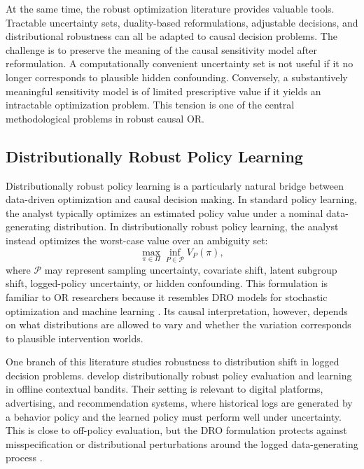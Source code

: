 \documentclass[11pt]{article}
\begin{document}
At the same time, the robust optimization literature provides valuable tools. Tractable uncertainty sets, duality-based reformulations, adjustable decisions, and distributional robustness can all be adapted to causal decision problems. The challenge is to preserve the meaning of the causal sensitivity model after reformulation. A computationally convenient uncertainty set is not useful if it no longer corresponds to plausible hidden confounding. Conversely, a substantively meaningful sensitivity model is of limited prescriptive value if it yields an intractable optimization problem. This tension is one of the central methodological problems in robust causal OR.

\subsection{Distributionally Robust Policy Learning}

Distributionally robust policy learning is a particularly natural bridge between data-driven optimization and causal decision making. In standard policy learning, the analyst typically optimizes an estimated policy value under a nominal data-generating distribution. In distributionally robust policy learning, the analyst instead optimizes the worst-case value over an ambiguity set:
\[
    \max_{\pi\in\Pi}\inf_{P\in\mathcal{P}} V_P(\pi),
\]
where $\mathcal{P}$ may represent sampling uncertainty, covariate shift, latent subgroup shift, logged-policy uncertainty, or hidden confounding. This formulation is familiar to OR researchers because it resembles DRO models for stochastic optimization and machine learning \citep{rahimian2019dro,kuhn2019wasserstein}. Its causal interpretation, however, depends on what distributions are allowed to vary and whether the variation corresponds to plausible intervention worlds.

One branch of this literature studies robustness to distribution shift in logged decision problems. \citet{si2020dro} develop distributionally robust policy evaluation and learning in offline contextual bandits. Their setting is relevant to digital platforms, advertising, and recommendation systems, where historical logs are generated by a behavior policy and the learned policy must perform well under uncertainty. This is close to off-policy evaluation, but the DRO formulation protects against misspecification or distributional perturbations around the logged data-generating process \citep{dudik2011doubly,swaminathan2015counterfactual,si2020dro}.
\end{document}
